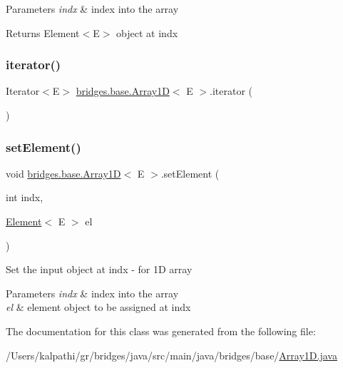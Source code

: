 \begin{DoxyParams}{Parameters}
{\em indx} & index into the array \\
\hline
\end{DoxyParams}
\begin{DoxyReturn}{Returns}
Element$<$\+E$>$ object at \textquotesingle{}indx\textquotesingle{} 
\end{DoxyReturn}
\mbox{\label{classbridges_1_1base_1_1_array1_d_aed723a9f55895c1673e73cb818be7c15}} 
\subsubsection{\texorpdfstring{iterator()}{iterator()}}
{\footnotesize\ttfamily Iterator$<$E$>$ \mbox{\hyperlink{classbridges_1_1base_1_1_array1_d}{bridges.\+base.\+Array1D}}$<$ E $>$.iterator (\begin{DoxyParamCaption}{ }\end{DoxyParamCaption})}

\mbox{\label{classbridges_1_1base_1_1_array1_d_ac749a6d97307998a2b37773456aca0fe}} 
\subsubsection{\texorpdfstring{setElement()}{setElement()}}
{\footnotesize\ttfamily void \mbox{\hyperlink{classbridges_1_1base_1_1_array1_d}{bridges.\+base.\+Array1D}}$<$ E $>$.set\+Element (\begin{DoxyParamCaption}\item[{int}]{indx,  }\item[{\mbox{\hyperlink{classbridges_1_1base_1_1_element}{Element}}$<$ E $>$}]{el }\end{DoxyParamCaption})}

Set the input object at \textquotesingle{}indx\textquotesingle{} -\/ for 1D array


\begin{DoxyParams}{Parameters}
{\em indx} & index into the array \\
\hline
{\em el} & element object to be assigned at \textquotesingle{}indx\textquotesingle{} \\
\hline
\end{DoxyParams}


The documentation for this class was generated from the following file\+:\begin{DoxyCompactItemize}
\item 
/\+Users/kalpathi/gr/bridges/java/src/main/java/bridges/base/\mbox{\hyperlink{_array1_d_8java}{Array1\+D.\+java}}\end{DoxyCompactItemize}
